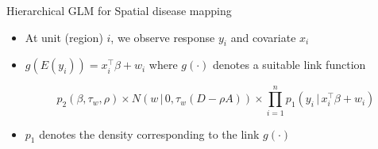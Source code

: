 \documentclass[10pt]{beamer}
\newcommand{\given}{\, | \,}
\begin{document}
\begin{frame}{Hierarchical GLM for Spatial disease mapping}
	\begin{itemize}
		\item At unit (region) $i$, we observe response $y_i$ and  covariate $x_i$
		\item $g(E(y_i)) = x^{\top}_i\beta + w_i $ where $g(\cdot)$ denotes a suitable link function
		\begin{block}{}
		\[
		p_2(\beta,\tau_w, \rho) \times N(w \given 0, \tau_w (D-\rho A)) \times \prod_{i=1}^n p_1(y_i\given x_i^{\top}\beta+w_i)
		\]
		\end{block}
		\item $p_1$ denotes the density corresponding to the link $g(\cdot)$
	\end{itemize}
\end{frame}
\end{document}
